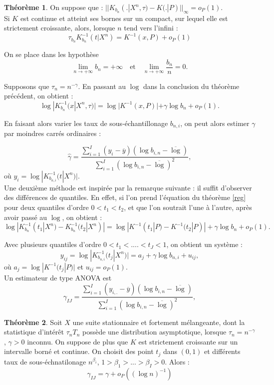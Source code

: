 \documentclass{article}
\theoremstyle{definition}
\newtheorem{thm}{Théorème}
\begin{document}
\begin{thm} \label{Reg} On suppose que : $||K_{b_n}(.|X^n,\tau)-K(.|P)||_\infty = o_P(1)$.\\
Si $K$ est continue et atteint ses bornes sur un compact, sur lequel elle est strictement croissante, alors, lorsque $n$ tend vers l'infini :
\[\tau_{b_n} K^{-1}_{b_n}(t|X^n)=K^{-1}(x,P)+ o_P(1)\]
\end{thm}

On se place dans les hypothèse \[\lim_{n\rightarrow +\infty} b_n=+\infty \quad \text{et}\quad\lim_{n\rightarrow +\infty}\frac{b_n}{n}=0.\]

Supposons que $\tau_n=n^{-\gamma}$. En passant au $\log$ dans la conclusion du théorème précédent, on obtient :
\[\log |K^{-1}_{b_n}(x|X^n,\tau)|=\log |K^{-1}(x,P)| + \gamma \log b_n +o_P(1).\]

En faisant alors varier les taux de sous-échantillonage $b_{n,i}$, on peut alors estimer $\gamma$ par moindres carrés ordinaires :

\[\hat\gamma=\frac{\sum_{i=1}^I(y_i-\overline y)(\log b_{i,n}-\overline\log)}{\sum_{i=1}^I(\log b_{i,n}-\overline\log)^2},\]
où $y_i=\log |K^{-1}_{b_{n,i}}(t|X^n)|$.\\

Une deuxième méthode est inspirée par la remarque suivante : il  suffit d'observer des différences de quantiles. En effet, si l'on prend l'équation du théorème \ref{reg} pour deux quantiles d'ordre $0<t_1<t_2$, et que l'on soutrait l'une à l'autre, après avoir passé au $\log$, on obtient :
\[\log|K^{-1}_{b_{n}}(t_1|X^n)-K^{-1}_{b_{n}}(t_2|X^n)| =\log|K^{-1}(t_1|P)-K^{-1}(t_2|P)|  + \gamma \log b_n +o_P(1).\]

Avec plusieurs quantiles d'ordre $0<t_1<....< t_J<1$, on obtient un système :
\[y_{ij}= \log|K^{-1}_{b_{n,i}}(t_j|X^n)|=a_j+\gamma \log b_{n,i}+u_{ij}, \]
où $a_j=\log|K^{-1}(t_j|P)| $ et $u_{ij}=o_P(1)$.\\

 Un estimateur de type ANOVA est 
\[\gamma_{IJ}=\frac{\sum_{i=1}^I(y_{i,.}-\overline y)(\log b_{i,n}-\overline\log)}{\sum_{i=1}^I(\log b_{i,n}-\overline\log)^2},\]

\begin{thm}
Soit $X$ une suite stationnaire et fortement mélangeante, dont la statistique d'intérêt $\tau_n T_n$ possède une distribution asymptotique, lorsque $\tau_n = n^{-\gamma}$, $\gamma>0$ inconnu. On suppose de plus que $K$ est strictement croissante sur un intervalle borné et continue. On choisit des point $t_j$ dans $(0,1)$ et différents taux de sous-échnatilonage $n^{\beta_i}$, $1>\beta_1>...>\beta_I>0$. Alors :
\[\gamma _{IJ}=\gamma +o_P((\log n )^{-1})\]
\end{thm}
\end{document}
